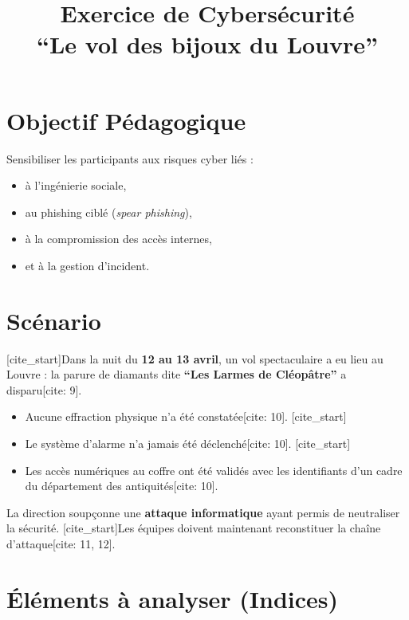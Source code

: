 \documentclass[a4paper,11pt]{article}
\title{\textbf{Exercice de Cybersécurité}\\ \large ``Le vol des bijoux du Louvre''}
\author{}
\date{}
\begin{document}
\maketitle

\section{Objectif Pédagogique}
Sensibiliser les participants aux risques cyber liés :
\begin{itemize}
    \item à l’ingénierie sociale,
    \item au phishing ciblé (\textit{spear phishing}),
    \item à la compromission des accès internes,
    \item et à la gestion d'incident.
\end{itemize}

\section{Scénario}
[cite_start]Dans la nuit du \textbf{12 au 13 avril}, un vol spectaculaire a eu lieu au Louvre : la parure de diamants dite \textbf{``Les Larmes de Cléopâtre''} a disparu[cite: 9].

\begin{itemize}
    [cite_start]\item Aucune effraction physique n’a été constatée[cite: 10].
    [cite_start]\item Le système d’alarme n’a jamais été déclenché[cite: 10].
    [cite_start]\item Les accès numériques au coffre ont été validés avec les identifiants d’un cadre du département des antiquités[cite: 10].
\end{itemize}

La direction soupçonne une \textbf{attaque informatique} ayant permis de neutraliser la sécurité. [cite_start]Les équipes doivent maintenant reconstituer la chaîne d’attaque[cite: 11, 12].

\section{Éléments à analyser (Indices)}
\end{document}
